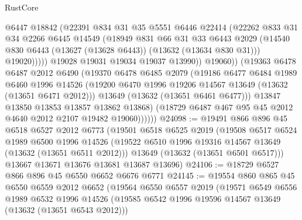 \begin{lexlean}{RustCore}
\begin{coremodule}
                        @6447
                        @18842
                        (@22391
                          @834
                          @31
                          @35
                          @5551
                          @6446
                          @22414
                          (@22262
                            @833
                            @31
                            @34
                            @2266
                            @6445
                            @14549
                            (@18949
                              @831
                              @66
                              @31
                              @33
                              @6443
                              @2029
                              (@14540 @830 @6443 (@13627 (@13628 @6443)) (@13632 (@13634 @830 @31)))
                              @19020)))))
                    @19028
                    @19031
                    @19034
                    @19037
                    @13990))
                @19060))
            (@19363
              @6478
              @6487
              @2012
              @6490
              (@19370
                @6478
                @6485
                @2079
                (@19186
                  @6477
                  @6484
                  @1989
                  @6460
                  @1996
                  @14526
                  (@19200 @6470 @1996 @19206 @14567 @13649 (@13632 (@13651 @6471 @2012)))
                  @13649
                  (@13632 (@13651 @6461 @6477)))
                @13847
                @13850
                @13853
                @13857
                @13862
                @13868)
              (@18729 @6487 @467 @95 @45 @2012 @4640 @2012 @2107 @19482 @19060))))))
@24098 := @19491
    @866
    @896
    @45
    @6518
    @6527
    @2012
    @6773
    (@19501
      @6518
      @6525
      @2019
      (@19508
        @6517
        @6524
        @1989
        @6500
        @1996
        @14526
        (@19522 @6510 @1996 @19316 @14567 @13649 (@13632 (@13651 @6511 @2012)))
        @13649
        (@13632 (@13651 @6501 @6517)))
      @13667
      @13671
      @13676
      @13681
      @13687
      @13696)
@24106 := @18729 @6527 @866 @896 @45 @6550 @6652 @6676 @6771
@24145 := @19554
    @860
    @865
    @45
    @6550
    @6559
    @2012
    @6652
    (@19564
      @6550
      @6557
      @2019
      (@19571
        @6549
        @6556
        @1989
        @6532
        @1996
        @14526
        (@19585 @6542 @1996 @19596 @14567 @13649 (@13632 (@13651 @6543 @2012)))

\end{coremodule}
\end{lexlean}
